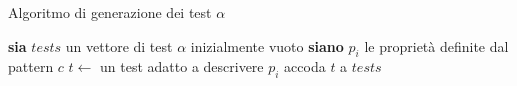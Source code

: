 
\begin{algorithm}
\caption{Algoritmo di generazione dei test $\alpha$}\label{alg:analyzer-test-alpha}
\begin{algorithmic}
\State \textbf{sia} $tests$ un vettore di test $\alpha$ inizialmente vuoto
\State \textbf{siano} $p_i$ le proprietà definite dal pattern $c$
		\State $t \gets$ un test adatto a descrivere $p_i$
		\State accoda $t$ a $tests$
	\EndIf
\EndFor
\State {}
\EndFunction
\end{algorithmic}
\end{algorithm}
